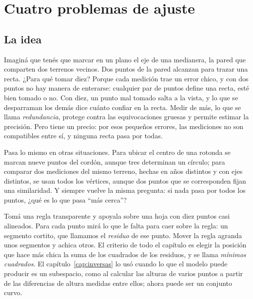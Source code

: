 \chapter{Cuatro problemas de ajuste}\label{cap:cuatro-problemas}

\section{La idea}

Imaginá que tenés que marcar en un plano el eje de una medianera, la pared que comparten dos
terrenos vecinos. Dos puntos de la pared alcanzan para trazar una recta. ¿Para qué tomar
diez? Porque cada medición trae un error chico, y con dos puntos no hay manera de enterarse:
cualquier par de puntos define una recta, esté bien tomado o no. Con diez, un punto mal tomado
salta a la vista, y lo que se desparraman los demás dice cuánto confiar en la recta. Medir de
más, lo que se llama \emph{redundancia}, protege contra las equivocaciones gruesas y permite
estimar la precisión. Pero tiene un precio: por esos pequeños errores, las mediciones no son
compatibles entre sí, y ninguna recta pasa por todas.

Pasa lo mismo en otras situaciones. Para ubicar el centro de una rotonda se marcan nueve
puntos del cordón, aunque tres determinan un círculo; para comparar dos mediciones del mismo
terreno, hechas en años distintos y con ejes distintos, se usan todos los vértices, aunque dos
puntos que se corresponden fijan una similaridad. Y siempre vuelve la misma pregunta: si nada
pasa por todos los puntos, ¿qué es lo que pasa \enquote{más cerca}?

Tomá una regla transparente y apoyala sobre una hoja con diez puntos casi alineados. Para cada
punto mirá lo que le falta para caer sobre la regla: un segmento cortito, que llamamos el
\emph{residuo} de ese punto. Mover la regla agranda unos segmentos y achica otros. El criterio
de todo el capítulo es elegir la posición que hace más chica la suma de los cuadrados de los
residuos, y se llama \emph{mínimos cuadrados}. El capítulo~\ref{cap:inversas} lo usó cuando lo
que el modelo puede producir es un subespacio, como al calcular las alturas de varios puntos a
partir de las diferencias de altura medidas entre ellos; ahora puede ser un conjunto curvo.

